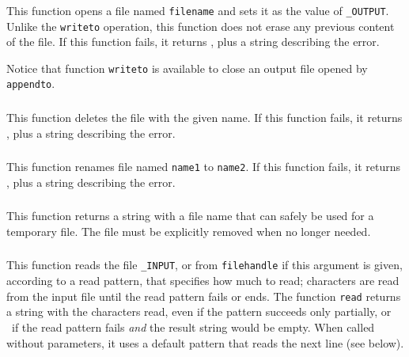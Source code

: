 \subsubsection*{\ff {}}

This function opens a file named \verb|filename| and sets it as the
value of \verb|_OUTPUT|.
Unlike the \verb|writeto| operation,
this function does not erase any previous content of the file.
If this function fails, it returns \nil,
plus a string describing the error.

Notice that function \verb|writeto| is
available to close an output file opened by \verb|appendto|.

\subsubsection*{\ff {}}

This function deletes the file with the given name.
If this function fails, it returns \nil,
plus a string describing the error.

\subsubsection*{\ff {}}

This function renames file named \verb|name1| to \verb|name2|.
If this function fails, it returns \nil,
plus a string describing the error.

\subsubsection*{\ff {}}

This function returns a string with a file name that can safely
be used for a temporary file.
The file must be explicitly removed when no longer needed.

\subsubsection*{\ff {}}

This function reads the file \verb|_INPUT|,
or from \verb|filehandle| if this argument is given,
according to a read pattern, that specifies how much to read;
characters are read from the input file until
the read pattern fails or ends.
The function \verb|read| returns a string with the characters read,
even if the pattern succeeds only partially,
or \nil\ if the read pattern fails \emph{and}
the result string would be empty.
When called without parameters,
it uses a default pattern that reads the next line
(see below).

